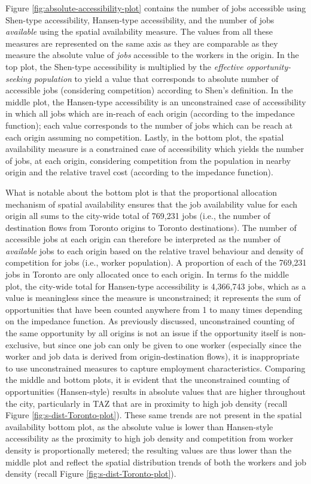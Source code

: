 \documentclass[10pt,letterpaper]{article}
\begin{document}
Figure \ref{fig:absolute-accessibility-plot} contains the number of jobs
accessible using Shen-type accessibility, Hansen-type accessibility, and
the number of jobs \emph{available} using the spatial availability
measure. The values from all these measures are represented on the same
axis as they are comparable as they measure the absolute value of
\emph{jobs} accessible to the workers in the origin. In the top plot,
the Shen-type accessibility is multiplied by the \emph{effective
opportunity-seeking population} to yield a value that corresponds to
absolute number of accessible jobs (considering competition) according
to Shen's definition. In the middle plot, the Hansen-type accessibility
is an unconstrained case of accessibility in which all jobs which are
in-reach of each origin (according to the impedance function); each
value corresponds to the number of jobs which can be reach at each
origin assuming no competition. Lastly, in the bottom plot, the spatial
availability measure is a constrained case of accessibility which yields
the number of jobs, at each origin, considering competition from the
population in nearby origin and the relative travel cost (according to
the impedance function).

What is notable about the bottom plot is that the proportional
allocation mechanism of spatial availability ensures that the job
availability value for each origin all sums to the city-wide total of
769,231 jobs (i.e., the number of destination flows from Toronto origins
to Toronto destinations). The number of accessible jobs at each origin
can therefore be interpreted as the number of \emph{available} jobs to
each origin based on the relative travel behaviour and density of
competition for jobs (i.e., worker population). A proportion of each of
the 769,231 jobs in Toronto are only allocated once to each origin. In
terms fo the middle plot, the city-wide total for Hansen-type
accessibility is 4,366,743 jobs, which as a value is meaningless since
the measure is unconstrained; it represents the sum of opportunities
that have been counted anywhere from 1 to many times depending on the
impedance function. As previously discussed, unconstrained counting of
the same opportunity by all origins is not an issue if the opportunity
itself is non-exclusive, but since one job can only be given to one
worker (especially since the worker and job data is derived from
origin-destination flows), it is inappropriate to use unconstrained
measures to capture employment characteristics. Comparing the middle and
bottom plots, it is evident that the unconstrained counting of
opportunities (Hansen-style) results in absolute values that are higher
throughout the city, particularly in TAZ that are in proximity to high
job density (recall Figure \ref{fig:s-dist-Toronto-plot}). These same
trends are not present in the spatial availability bottom plot, as the
absolute value is lower than Hansen-style accessibility as the proximity
to high job density and competition from worker density is
proportionally metered; the resulting values are thus lower than the
middle plot and reflect the spatial distribution trends of both the
workers and job density (recall Figure \ref{fig:s-dist-Toronto-plot}).
\end{document}
